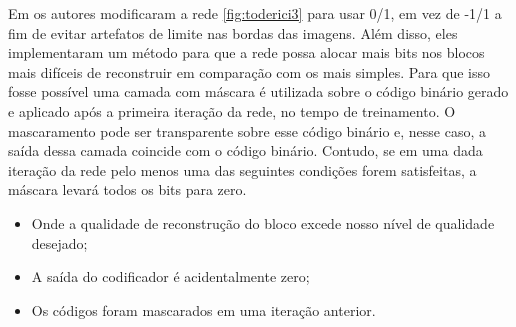 






Em \cite{target} os autores modificaram a rede \ref{fig:toderici3} 
para usar 0/1, em vez de -1/1 a fim de evitar artefatos de limite nas bordas das imagens. Além disso, eles implementaram um método para que a rede possa alocar mais bits nos blocos mais difíceis de reconstruir em comparação com os mais simples. 
Para que isso fosse possível uma camada com máscara é utilizada sobre o código binário gerado e aplicado após a primeira iteração da rede, no tempo de treinamento.
O mascaramento pode ser transparente sobre esse código binário e, nesse caso, a saída dessa camada coincide com o código binário. Contudo, se em uma dada iteração da rede pelo menos uma das seguintes condições forem satisfeitas, a máscara levará todos os bits para zero. 

\begin{itemize}
	\item  Onde a qualidade de reconstrução do bloco excede nosso nível de qualidade desejado;
	\item A saída do codificador é acidentalmente zero;
	\item Os códigos foram mascarados em uma iteração anterior.
\end{itemize}

